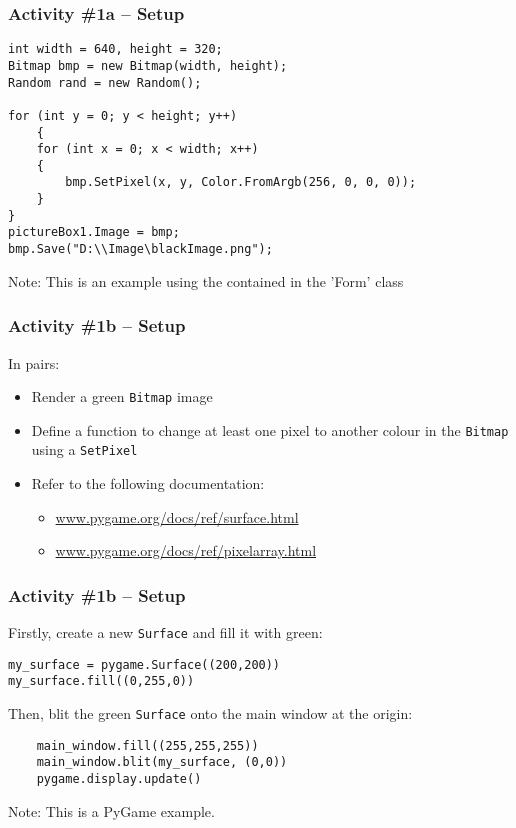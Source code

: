 \begin{frame}[fragile]
	\frametitle{Activity \#1a -- Setup}
	
\begin{lstlisting}
int width = 640, height = 320;
Bitmap bmp = new Bitmap(width, height);
Random rand = new Random();

for (int y = 0; y < height; y++)
	{
	for (int x = 0; x < width; x++)
	{
		bmp.SetPixel(x, y, Color.FromArgb(256, 0, 0, 0));
	}
}
pictureBox1.Image = bmp;
bmp.Save("D:\\Image\blackImage.png");
\end{lstlisting}

Note: This is an example using the contained in the 'Form' class

\end{frame}
	
\begin{frame}
	\frametitle{Activity \#1b -- Setup}
	
	In pairs:
	
	\vspace{2em}
	
	\begin{itemize}		
		\item Render a green \texttt{Bitmap} image
		\item Define a function to change at least one pixel to another colour in the \texttt{Bitmap} using a \texttt{SetPixel}
		\item Refer to the following documentation:
		\begin{itemize}
			\item \url{www.pygame.org/docs/ref/surface.html}
			\item \url{www.pygame.org/docs/ref/pixelarray.html}
		\end{itemize}
	\end{itemize}
\end{frame}

\begin{frame}[fragile]
	\frametitle{Activity \#1b -- Setup}

Firstly, create a new \texttt{Surface} and fill it with green:
	
\begin{lstlisting}
my_surface = pygame.Surface((200,200))
my_surface.fill((0,255,0))
\end{lstlisting}

\vspace{0.5em}

Then, blit the green \texttt{Surface} onto the main window at the origin:

\begin{lstlisting}
    main_window.fill((255,255,255))
    main_window.blit(my_surface, (0,0))
    pygame.display.update()
\end{lstlisting}

Note: This is a PyGame example.

\end{frame}

